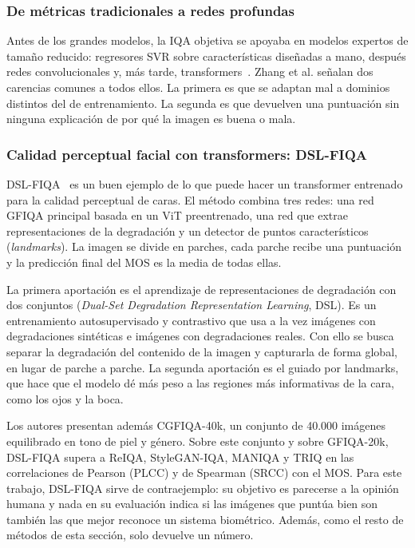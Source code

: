 \subsubsection{De métricas tradicionales a redes profundas}
Antes de los grandes modelos, la IQA objetiva se apoyaba en modelos expertos de tamaño reducido: regresores SVR sobre características diseñadas a mano, después redes convolucionales y, más tarde, transformers~\cite{Zhang_2025_TOMM}. Zhang et al. señalan dos carencias comunes a todos ellos. La primera es que se adaptan mal a dominios distintos del de entrenamiento. La segunda es que devuelven una puntuación sin ninguna explicación de por qué la imagen es buena o mala.

\subsubsection{Calidad perceptual facial con transformers: DSL-FIQA}
DSL-FIQA~\cite{Chen_2024_CVPR} es un buen ejemplo de lo que puede hacer un transformer entrenado para la calidad perceptual de caras. El método combina tres redes: una red GFIQA principal basada en un ViT preentrenado, una red que extrae representaciones de la degradación y un detector de puntos característicos (\textit{landmarks}). La imagen se divide en parches, cada parche recibe una puntuación y la predicción final del MOS es la media de todas ellas.

La primera aportación es el aprendizaje de representaciones de degradación con dos conjuntos (\textit{Dual-Set Degradation Representation Learning}, DSL). Es un entrenamiento autosupervisado y contrastivo que usa a la vez imágenes con degradaciones sintéticas e imágenes con degradaciones reales. Con ello se busca separar la degradación del contenido de la imagen y capturarla de forma global, en lugar de parche a parche. La segunda aportación es el guiado por landmarks, que hace que el modelo dé más peso a las regiones más informativas de la cara, como los ojos y la boca.

Los autores presentan además CGFIQA-40k, un conjunto de 40.000 imágenes equilibrado en tono de piel y género. Sobre este conjunto y sobre GFIQA-20k, DSL-FIQA supera a ReIQA, StyleGAN-IQA, MANIQA y TRIQ en las correlaciones de Pearson (PLCC) y de Spearman (SRCC) con el MOS. Para este trabajo, DSL-FIQA sirve de contraejemplo: su objetivo es parecerse a la opinión humana y nada en su evaluación indica si las imágenes que puntúa bien son también las que mejor reconoce un sistema biométrico. Además, como el resto de métodos de esta sección, solo devuelve un número.

